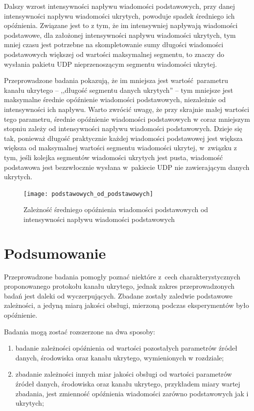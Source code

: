 \documentclass[a4paper, twoside, 12pt]{report}
\begin{document}
            Dalszy wzrost intensywności napływu wiadomości podstawowych, przy danej
            intensywności napływu wiadomości ukrytych, powoduje
            spadek średniego ich opóźnienia. Związane jest to z tym, że im intensywniej
            napływają wiadomości podstawowe, dla założonej intensywności napływu wiadomości
            ukrytych, tym mniej czasu jest potrzebne na skompletowanie sumy długości
            wiadomości podstawowych większej od wartości maksymalnej segmentu, to znaczy
            do wysłania pakietu UDP nieprzenoszącym segmentu wiadomości ukrytej.

            Przeprowadzone badania pokazują, że im mniejsza jest wartość parametru
            kanału ukrytego -- ,,długość segmentu danych ukrytych'' -- tym mniejsze
            jest maksymalne średnie opóźnienie wiadomości podstawowych, niezależnie
            od intensywności ich napływu. Warto zwrócić uwagę, że przy skrajnie małej wartości tego
            parametru, średnie opóźnienie wiadomości podstawowych w coraz mniejszym stopniu
            zależy od intensywności napływu wiadomości podstawowych. Dzieje się tak, ponieważ długość praktycznie
            każdej wiadomości podstawowej jest większa większa od maksymalnej wartości
            segmentu wiadomości ukrytej, w~związku z tym, jeśli
            kolejka segmentów wiadomości ukrytych jest pusta, wiadomość podstawowa jest
            bezzwłocznie wysłana w~pakiecie UDP nie zawierającym danych ukrytych.

        \begin{figure}[h]
                \centering
                \texttt{[image: podstawowych\_od\_podstawowych]}
                \caption{Zależność średniego opóźnienia wiadomości podstawowych od
                    intensywności napływu wiadomości podstawowych}
                \label{OPOZNIENIEPODSTAWOWYCHODPODSTAWOWYCH}
        \end{figure}

        \section{Podsumowanie}
        Przeprowadzone badania pomogły poznać niektóre z~cech charakterystycznych
        proponowanego protokołu kanału ukrytego, jednak zakres przeprowadzonych badań
        jest daleki od wyczerpujących. Zbadane
        zostały zaledwie podstawowe zależności, a jedyną miarą jakości obsługi,
        mierzoną podczas eksperymentów było opóźnienie.

        Badania mogą zostać rozszerzone na dwa sposoby:
        \begin{enumerate}
            \item badanie zależności opóźnienia od wartości pozostałych parametrów źródeł
                danych, środowiska oraz kanału ukrytego, wymienionych w rozdziale;
            \item zbadanie zależności innych miar jakości obsługi od wartości parametrów
                źródeł danych, środowiska oraz kanału ukrytego, przykładem miary
                wartej zbadania, jest zmienność opóźnienia wiadomości zarówno
                podstawowych jak i ukrytych;
            \end{enumerate}
\end{document}
